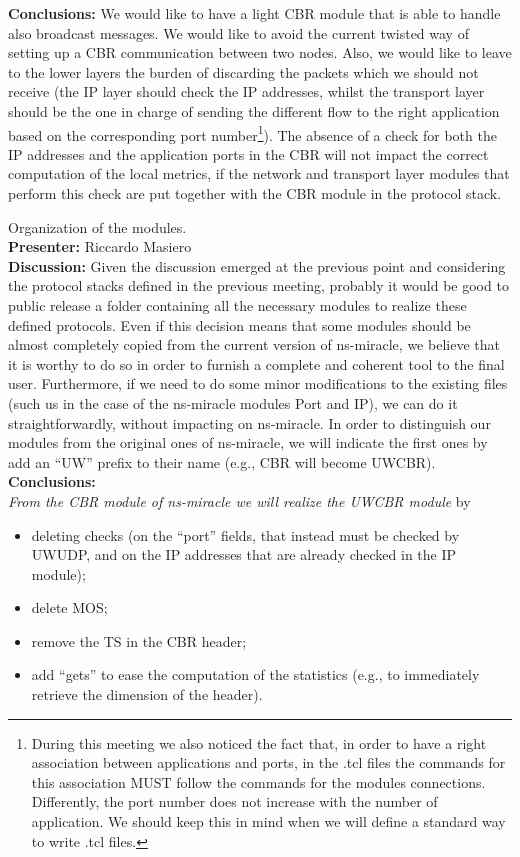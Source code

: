 \documentclass[11pt,journal,draftclsnofoot,onecolumn,twoside,letterpaper]{IEEEtran}
\theoremstyle{definition} \newtheorem{definition}[]{Definition}
\theoremstyle{theorem} \newtheorem{theorem}[]{Theorem}
\begin{document}
{\bf Conclusions:} We would like to have a light CBR module that is able to handle also broadcast messages. We would like to avoid the current twisted way of setting up a CBR communication between two nodes. Also, we would like to leave to the lower layers the burden of discarding the packets which we should not receive (the IP layer should check the IP addresses, whilst the transport layer should be the one in charge of sending the different flow to the right application based on the corresponding port number\footnote{During this meeting we also noticed the fact that, in order to have a right association between applications and ports, in the .tcl files the commands for this association MUST follow the commands for the modules connections. Differently, the port number does not increase with the number of application. We should keep this in mind when we will define a standard way to write .tcl files.}). The absence of a check for both the IP addresses and the application ports in the CBR will not impact the correct computation of the local metrics, if the network and transport layer modules that perform this check are put together with the CBR module in the protocol stack.


 Organization of the modules.\\
{\bf Presenter:} Riccardo Masiero\\
{\bf Discussion:} Given the discussion emerged at the previous point and considering the protocol stacks defined in the previous meeting, probably it would be good to public release a folder containing all the necessary modules to realize these defined protocols. Even if this decision means that some modules should be almost completely copied from the current version of ns-miracle, we believe that it is worthy to do so in order to furnish a complete and coherent tool to the final user. Furthermore, if we need to do some minor modifications to the existing files (such us in the case of the ns-miracle modules Port and IP), we can do it straightforwardly, without impacting on ns-miracle. In order to distinguish our modules from the original ones of ns-miracle, we will indicate the first ones by add an ``UW'' prefix to their name (e.g., CBR will become UWCBR).\\
%
{\bf Conclusions:}\\
{\it From the CBR module of ns-miracle we will realize the UWCBR module} by 
\begin{itemize}
 \item deleting checks (on the ``port'' fields, that instead must be checked by UWUDP, and on the IP addresses that are already checked in the IP module);
 \item delete MOS;
 \item remove the TS in the CBR header;
 \item add ``gets'' to ease the computation of the statistics (e.g., to immediately retrieve the dimension of the header).
\end{itemize}
\end{document}
